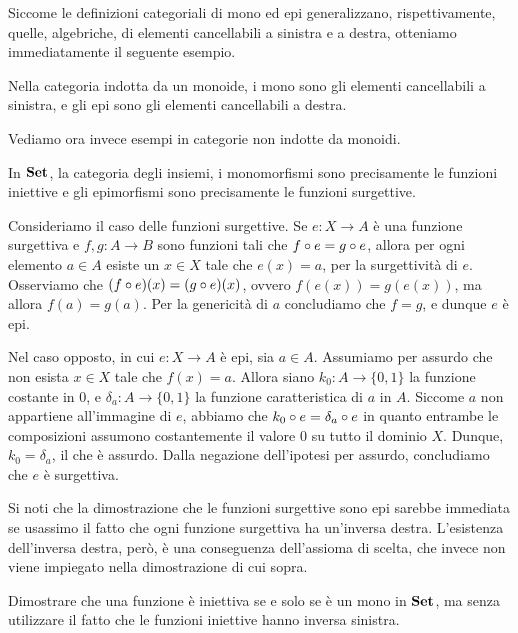 Siccome le definizioni categoriali di mono ed epi generalizzano, rispettivamente, quelle, algebriche, di elementi cancellabili a sinistra e a destra,
otteniamo immediatamente il seguente esempio.

\begin{example}
	Nella categoria indotta da un monoide, i mono sono gli elementi cancellabili a sinistra,
	e gli epi sono gli elementi cancellabili a destra.
\end{example}

Vediamo ora invece esempi in categorie non indotte da monoidi.

\begin{example}
	In \(\mathbf{Set}\), la categoria degli insiemi, i monomorfismi sono precisamente le funzioni iniettive
	e gli epimorfismi sono precisamente le funzioni surgettive.

	Consideriamo il caso delle funzioni surgettive.
	Se \(e \colon X \to A\) è una funzione surgettiva e \(f, g \colon A \to B\) sono funzioni tali che \(f \circ e = g \circ e\),
	allora per ogni elemento \(a \in A\) esiste un \(x \in X\) tale che \(e(x) = a\), per la surgettività di \(e\).
	Osserviamo che \((f \circ e)(x) = (g \circ e)(x)\), ovvero \(f(e(x)) = g(e(x))\),
	ma allora \(f(a) = g(a)\).
	Per la genericità di \(a\) concludiamo che \(f = g\), e dunque \(e\) è epi.

	Nel caso opposto, in cui \(e \colon X \to A\) è epi, sia \(a \in A\).
	Assumiamo per assurdo che non esista \(x \in X\) tale che \(f(x) = a\).
	Allora siano \(k_0 \colon A \to \{0, 1\}\) la funzione costante in \(0\),
	e \(\delta_a \colon A \to \{0, 1\}\) la funzione caratteristica di \(a\) in \(A\).
	Siccome \(a\) non appartiene all'immagine di \(e\), abbiamo che \(k_0 \circ e = \delta_a \circ e\)
	in quanto entrambe le composizioni assumono costantemente il valore \(0\) su tutto il dominio \(X\).
	Dunque, \(k_0 = \delta_a\), il che è assurdo.
	Dalla negazione dell'ipotesi per assurdo, concludiamo che \(e\) è surgettiva.
\end{example}

Si noti che la dimostrazione che le funzioni surgettive sono epi sarebbe immediata
se usassimo il fatto che ogni funzione surgettiva ha un'inversa destra.
L'esistenza dell'inversa destra, però, è una conseguenza dell'assioma di scelta,
che invece non viene impiegato nella dimostrazione di cui sopra.

\begin{exercise}
	Dimostrare che una funzione è iniettiva se e solo se è un mono in \(\mathbf{Set}\),
	ma senza utilizzare il fatto che le funzioni iniettive hanno inversa sinistra.
\end{exercise}

